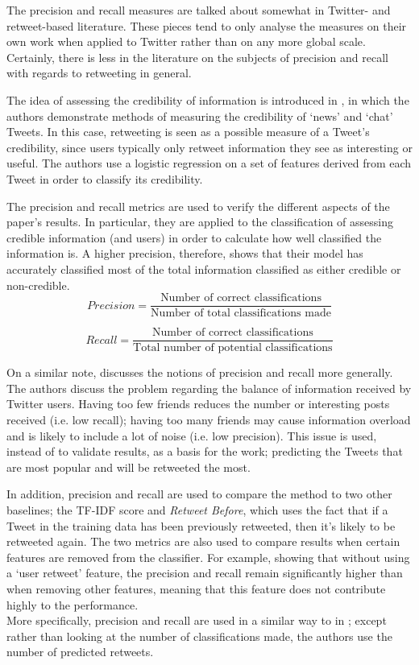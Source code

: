 The precision and recall measures are talked about somewhat in Twitter- and retweet-based literature. These pieces tend to only analyse the measures on their own work when applied to Twitter rather than on any more global scale. Certainly, there is less in the literature on the subjects of precision and recall with regards to retweeting in general.

The idea of assessing the credibility of information is introduced in \cite{castillo11}, in which the authors demonstrate methods of measuring the credibility of `news' and `chat' Tweets. In this case, retweeting is seen as a possible measure of a Tweet's credibility, since users typically only retweet information they see as interesting or useful. The authors use a logistic regression on a set of features derived from each Tweet in order to classify its credibility. 

The precision and recall metrics are used to verify the different aspects of the paper's results. In particular, they are applied to the classification of assessing credible information (and users) in order to calculate how well classified the information is. A higher precision, therefore, shows that their model has accurately classified most of the total information classified as either credible or non-credible.
\[	
	Precision = \frac{\text{Number of correct classifications}}{\text{Number of total classifications made}}
\]

\[
	Recall = \frac{\text{Number of correct classifications}}{\text{Total number of potential classifications}}
\]

On a similar note, \cite{hong11} discusses the notions of precision and recall more generally. The authors discuss the problem regarding the balance of information received by Twitter users. Having too few friends reduces the number or interesting posts received (i.e. low recall); having too many friends may cause information overload and is likely to include a lot of noise (i.e. low precision). This issue is used, instead of to validate results,  as a basis for the work; predicting the Tweets that are most popular and will be retweeted the most.

In addition, precision and recall are used to compare the method to two other baselines; the TF-IDF score and \emph{Retweet Before}, which uses the fact that if a Tweet in the training data has been previously retweeted, then it's likely to be retweeted again. The two metrics are also used to compare results when certain features are removed from the classifier. For example, showing that without using a `user retweet' feature,
the precision and recall remain significantly higher than when removing other features, meaning that this feature does not contribute highly to the performance. \\
More specifically, precision and recall are used in a similar way to in \cite{castillo11}; except rather than looking at the number of classifications made, the authors use the number of predicted retweets.

